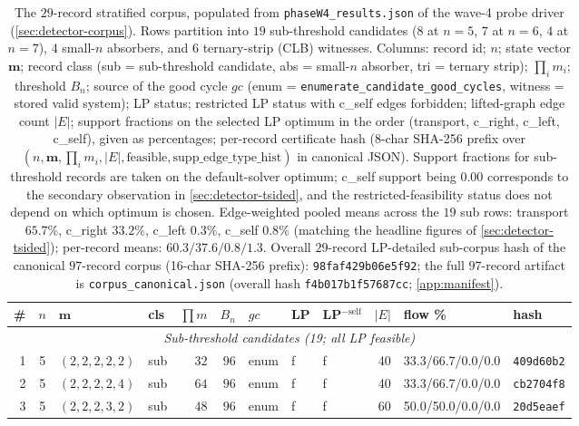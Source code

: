 \documentclass[11pt,a4paper]{article}
\theoremstyle{plain}
\theoremstyle{definition}
\newcommand{\Bn}{B_n}
\begin{document}
\begin{table}[ht]
\centering
\scriptsize
\caption{The $29$-record stratified corpus, populated from
\texttt{phaseW4\_results.json} of the wave-4 probe driver
(\cref{sec:detector-corpus}).  Rows partition into $19$ sub-threshold
candidates ($8$ at $n = 5$, $7$ at $n = 6$, $4$ at $n = 7$), $4$
small-$n$ absorbers, and $6$ ternary-strip (CLB) witnesses.  Columns:
record id; $n$; state vector $\mathbf{m}$; record class (sub =
sub-threshold candidate, abs = small-$n$ absorber, tri = ternary
strip); $\prod_i m_i$; threshold $\Bn$; source of the good cycle $gc$
(enum = \texttt{enumerate\_candidate\_good\_cycles}, witness = stored
valid system); LP status; restricted LP status with c\_self edges
forbidden; lifted-graph edge count $|E|$; support fractions on the
selected LP optimum in the order (transport, c\_right, c\_left,
c\_self), given as percentages; per-record certificate hash (8-char
SHA-256 prefix over $(n, \mathbf{m}, \prod_i m_i, |E|, \mathrm{feasible},
\mathrm{supp\_edge\_type\_hist})$ in canonical JSON).  Support fractions for
sub-threshold records are taken on the default-solver optimum;
c\_self support being $0.00$ corresponds to the secondary observation
in \cref{sec:detector-tsided}, and the restricted-feasibility status
does not depend on which optimum is chosen.  Edge-weighted pooled
means across the $19$ sub rows: transport $65.7\%$, c\_right
$33.2\%$, c\_left $0.3\%$, c\_self $0.8\%$ (matching the headline
figures of \cref{sec:detector-tsided}); per-record means:
$60.3 / 37.6 / 0.8 / 1.3$.  Overall $29$-record LP-detailed
sub-corpus hash of the canonical $97$-record corpus (16-char
SHA-256 prefix): \texttt{98faf429b06e5f92}; the full $97$-record
artifact is \texttt{corpus\_canonical.json} (overall hash
\texttt{f4b017b1f57687cc}; \cref{app:manifest}).}\label{tab:corpus-full}
\begin{tabular}{r c l l r r l l l r l l}
\toprule
\# & $n$ & $\mathbf{m}$ & cls & $\prod m$ & $\Bn$ & $gc$ & LP & LP$^{-\mathrm{self}}$ & $|E|$ & flow \% & hash\\\midrule
\multicolumn{12}{c}{\emph{Sub-threshold candidates (19; all LP feasible)}}\\\midrule
 1 & 5 & $(2,2,2,2,2)$       & sub & $32$  & $96$  & enum & f & f &  40 & 33.3/66.7/0.0/0.0 & \texttt{409d60b2}\\
 2 & 5 & $(2,2,2,2,4)$       & sub & $64$  & $96$  & enum & f & f &  40 & 33.3/66.7/0.0/0.0 & \texttt{cb2704f8}\\
 3 & 5 & $(2,2,2,3,2)$       & sub & $48$  & $96$  & enum & f & f &  60 & 50.0/50.0/0.0/0.0 & \texttt{20d5eaef}\\

\end{tabular}
\end{table}
\end{document}
